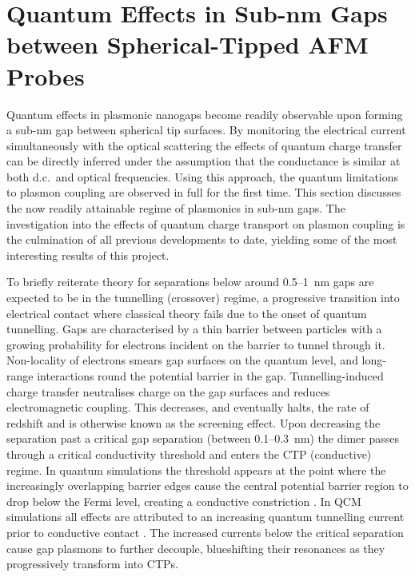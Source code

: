 \documentclass[a4paper, 11pt]{article}
\begin{document}
\section{Quantum Effects in Sub-nm Gaps between Spherical-Tipped AFM Probes}

Quantum effects in plasmonic nanogaps become readily observable upon forming a sub-nm gap between spherical tip surfaces. By monitoring the electrical current simultaneously with the optical scattering the effects of quantum charge transfer can be directly inferred under the assumption that the conductance is similar at both d.c.\ and optical frequencies. Using this approach, the quantum limitations to plasmon coupling are observed in full for the first time.
This section discusses the now readily attainable regime of plasmonics in sub-nm gaps. The investigation into the effects of quantum charge transport on plasmon coupling is the culmination of all previous developments to date, yielding some of the most interesting results of this project.

To briefly reiterate theory for separations below around 0.5--\SI{1}{nm} gaps are expected to be in the tunnelling (crossover) regime, a progressive transition into electrical contact where classical theory fails due to the onset of quantum tunnelling. Gaps are characterised by a thin barrier between particles with a growing probability for electrons incident on the barrier to tunnel through it. Non-locality of electrons smears gap surfaces on the quantum level, and long-range interactions round the potential barrier in the gap. Tunnelling-induced charge transfer neutralises charge on the gap surfaces and reduces electromagnetic coupling. This decreases, and eventually halts, the rate of redshift and is otherwise known as the screening effect. Upon decreasing the separation past a critical gap separation (between 0.1--\SI{0.3}{nm}) the dimer passes through a critical conductivity threshold and enters the CTP (conductive) regime. In quantum simulations the threshold appears at the point where the increasingly overlapping barrier edges cause the central potential barrier region to drop below the Fermi level, creating a conductive constriction \cite{zuloaga2009}. In QCM simulations all effects are attributed to an increasing quantum tunnelling current prior to conductive contact \cite{esteban2012, savage2012, esteban2015}. The increased currents below the critical separation cause gap plasmons to further decouple, blueshifting their resonances as they progressively transform into CTPs.
\end{document}
